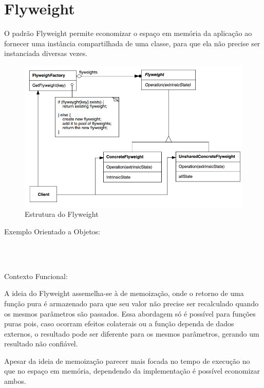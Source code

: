 \section{Flyweight}

O padrão Flyweight permite economizar o espaço em memória 
da aplicação ao fornecer uma instância compartilhada de 
uma classe, para que ela não precise ser instanciada 
diversas vezes.

\begin{figure}[htb]
	\caption{\label{fig_grafico}Estrutura do Flyweight}
	\begin{center}
	    \includegraphics[scale=0.5]{5_padroes-contexto-funcional/5.2_estruturais/5.2.6_flyweight/diagram.png}
	\end{center}
\end{figure}

Exemplo Orientado a Objetos:

\begin{lstlisting}[caption={Flyweight Orientado a Objetos},label=ooflyweight]



\end{lstlisting}

Contexto Funcional:

A ideia do Flyweight assemelha-se à de memoização, onde o 
retorno de uma função pura é armazenado para que seu valor 
não precise ser recalculado quando os mesmos parâmetros 
são passados. Essa abordagem só é possível para funções 
puras pois, caso ocorram efeitos colaterais ou a função 
dependa de dados externos, o resultado pode ser diferente 
para os mesmos parâmetros, gerando um resultado não 
confiável.

Apesar da ideia de memoização parecer mais focada no tempo 
de execução no que no espaço em memória, dependendo da 
implementação é possível economizar ambos.

\begin{lstlisting}[caption={Flyweight Funcional},label=fpflyweight]
    

    
\end{lstlisting}